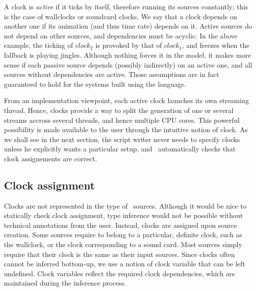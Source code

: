 A clock is \emph{active} if it ticks by itself,
therefore running its sources constantly; this
is the case of wallclocks or soundcard clocks.
We say that a clock depends on another one
if its animation (and thus time rate) depends on it.
Active sources do not depend on other sources,
and dependencies must be acyclic.
In the above example, the ticking of
$clock_2$ is provoked by that of
$clock_1$, and freezes when the fallback
is playing jingles.
Although nothing forces it in the model, it makes more sense if
each passive source depends (possibly indirectly) on an active one,
and all sources without dependencies are active.
Those assumptions are in fact guaranteed to hold for the systems
built using the \liquidsoap{} language.

From an implementation viewpoint, each active clock launches
its own streaming thread.
Hence, clocks provide a way to split the generation of one or
several streams accross several threads,
and hence multiple CPU cores.%
This powerful possibility is made available to the user
through the intuitive notion of clock.
As we shall see in the next section,
the script writer never needs to specify clocks unless he
explicitly wants a particular setup,
and \liquidsoap\ automatically checks that clock assignements
are correct.

\subsection{Clock assignment}

Clocks are not represented in the type of \liquidsoap\ sources.
Although it would be nice to statically check clock assignment,
type inference would not be possible without technical annotations
from the user. Instead, clocks are assigned upon source creation.
Some sources require to belong to a particular, definite clock,
such as the wallclock, or the clock corresponding to a sound card.
Most sources simply require that their clock is the same as their
input sources.
Since clocks often cannot be inferred bottom-up, we use a notion
of clock variable that can be left undefined.
Clock variables reflect the required clock dependencies,
which are maintained during the inference process.

